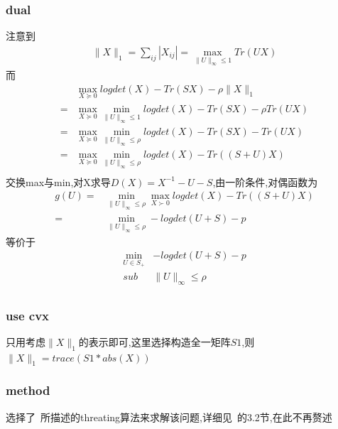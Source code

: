\documentclass[UTF8]{ctexart}
\begin{document}
    \subsubsection{dual}
    注意到
          \begin{equation}
    \begin{split}
\|X\|_1=\sum_{ij}|X_{ij}|=\max_{\|U\|_{\infty}\leq1}Tr(UX)
    \end{split}
  \end{equation}
  而
      \begin{equation}
    \begin{split}
   & \max_{X\succeq0} logdet(X)-Tr(SX)-\rho \|X\|_1  \\
    = &\max_{X\succeq0}\min_{\|U\|_{\infty}\leq1} logdet(X)-Tr(SX)-\rho Tr(UX)\\
    = & \max_{X\succeq0}\min_{\|U\|_{\infty}\leq\rho} logdet(X)-Tr(SX)- Tr(UX)\\
    = & \max_{X\succeq0}\min_{\|U\|_{\infty}\leq\rho} logdet(X)-Tr((S+U)X)\\
    \end{split}
  \end{equation}
交换max与min,对X求导$D(X)=X^{-1}-U-S$,由一阶条件,对偶函数为
\begin{equation}
    \begin{split}
        g(U)  = & \min_{\|U\|_{\infty}\leq\rho}\max_{X\succ0} logdet(X)-Tr((S+U)X)\\
    = & \min_{\|U\|_{\infty}\leq\rho}-logdet(U+S)-p
    \end{split}
  \end{equation}
  等价于
      \begin{equation}
    \begin{split}
    \min_{U\in S_{+}}&-logdet(U+S)-p \\
    sub & \|U\|_{\infty}\leq\rho\\
    \end{split}
  \end{equation}
  \subsubsection{use cvx}
  只用考虑$\|X\|_1$的表示即可,这里选择构造全一矩阵$S1$,则$\|X\|_1=trace(S1*abs(X))$
\subsubsection{method}
选择了~\cite{NIPS2012_4574}所描述的threating算法来求解该问题,详细见~\cite{NIPS2012_4574}的3.2节,在此不再赘述
\end{document}
